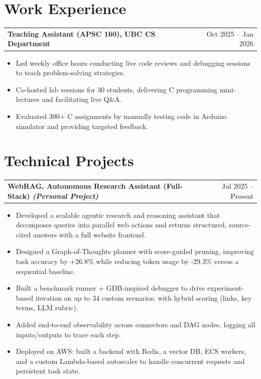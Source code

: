\documentclass[a4paper,11pt]{article}
\makeatletter
\newenvironment{joblong}[2]
    {
    \begin{tabularx}{\linewidth}{@{}l X r@{}}
    \textbf{#1} & \hfill &  #2 \\[3.75pt]
    \end{tabularx}
    \begin{minipage}[t]{\linewidth}
    \begin{itemize}[nosep,after=\strut, leftmargin=1em, itemsep=3pt,label=--]
    }
    {
    \end{itemize}
    \end{minipage}    
    }
\makeatother
\begin{document}

\section{Work Experience}

\begin{joblong}{Teaching Assistant (APSC 160), UBC CS Department}{Oct 2025 – Jan 2026}
\item Led weekly office hours conducting live code reviews and debugging sessions to teach problem-solving strategies.
\item Co-hosted lab sessions for 30 students, delivering C programming mini-lectures and facilitating live Q\&A.
\item Evaluated 300+ C assignments by manually testing code in Arduino simulator and providing targeted feedback.
\end{joblong}

\vspace{-7mm}



\section{Technical Projects}

\begin{joblong}{WebRAG, Autonomous Research Assistant (Full-Stack) \textit{(Personal Project)}}{Jul 2025 -- Present}
\item Developed a scalable agentic research and reasoning assistant that decomposes queries into parallel web actions and returns structured, source-cited answers with a full website frontend.
\item Designed a Graph-of-Thoughts planner with score-guided pruning, improving task accuracy by +26.8\% while reducing token usage by -29.3\% versus a sequential baseline.
\item Built a benchmark runner + GDB-inspired debugger to drive experiment-based iteration on up to 34 custom scenarios, with hybrid scoring (links, key terms, LLM rubric).
\item Added end-to-end observability across connectors and DAG nodes, logging all inputs/outputs to trace each step.
\item Deployed on AWS: built a backend with Redis, a vector DB, ECS workers, and a custom Lambda-based autoscaler to handle concurrent requests and persistent task state.
\end{joblong}
\end{document}
